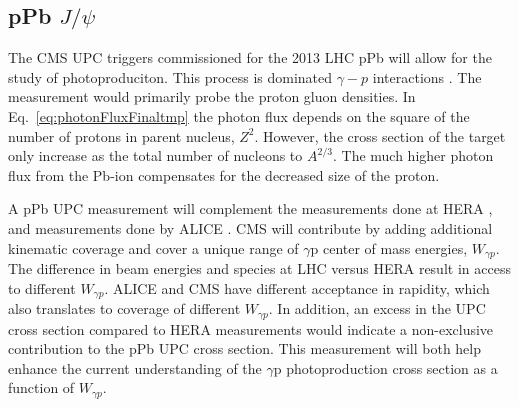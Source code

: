     \subsection{pPb $J/\psi$}
      The CMS UPC triggers commissioned for the 2013 LHC pPb will allow for the
        study of \JPsi{} photoproduciton.
      This process is dominated $\gamma-p$ interactions \cite{}.
      The measurement would primarily probe the proton gluon densities.
      In Eq.~\ref{eq:photonFluxFinaltmp} the photon flux depends on the square
      of the number of protons in parent nucleus, $Z^{2}$. 
      However, the cross section of the target only increase as the total 
        number of nucleons to $A^{2/3}$.
      The much higher photon flux from the Pb-ion compensates for 
        the decreased size of the proton.

      A pPb UPC \JPsi{} measurement will complement the measurements done at 
        HERA \cite{}, and measurements done by ALICE \cite{}.
      CMS will contribute by adding additional kinematic coverage and cover a 
        unique range of $\gamma$p center of mass energies, $W_{\gamma p}$. 
      The difference in beam energies and species at LHC versus HERA result in
        access to different $W_{\gamma p}$. 
      ALICE and CMS have different acceptance in \JPsi{} rapidity, which also 
        translates to coverage of different $W_{\gamma p}$.
      In addition, an excess in the UPC cross section compared to HERA 
        measurements would indicate a non-exclusive contribution to the pPb UPC 
        \JPsi{} cross section. 
      This measurement will both help enhance the current understanding of 
        the $\gamma$p \JPsi{} photoproduction cross section as a function of 
        $W_{\gamma p}$.
